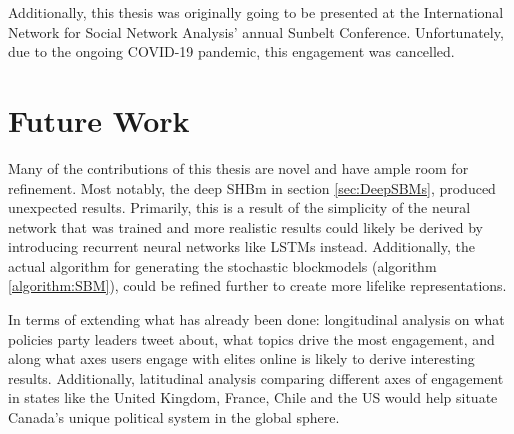 Additionally, this thesis was originally going to be presented at the
International Network for Social Network Analysis' annual Sunbelt Conference.
Unfortunately, due to the ongoing COVID-19 pandemic, this engagement was
cancelled.

\section{Future Work}

Many of the contributions of this thesis are novel and have ample room for
refinement. Most notably, the deep SHBm in section \ref{sec:DeepSBMs}, produced
unexpected results. Primarily, this is a result of the simplicity of the neural
network that was trained and more realistic results could likely be derived by
introducing recurrent neural networks like LSTMs instead. Additionally, the
actual algorithm for generating the stochastic blockmodels (algorithm
\ref{algorithm:SBM}), could be refined further to create more lifelike
representations.

In terms of extending what has already been done: longitudinal analysis on what
policies party leaders tweet about, what topics drive the most engagement, and
along what axes users engage with elites online is likely to derive interesting
results. Additionally, latitudinal analysis comparing different axes of
engagement in states like the United Kingdom, France, Chile and the US would
help situate Canada's unique political system in the global sphere. 
